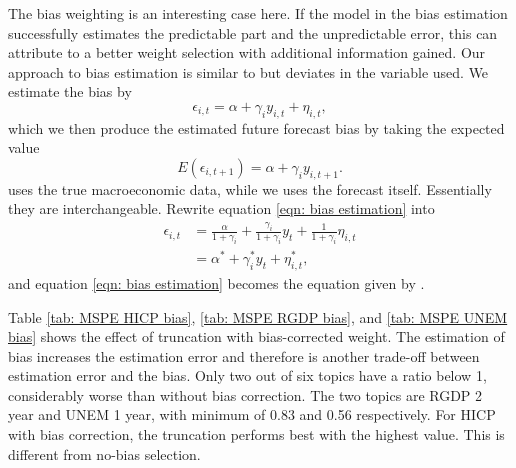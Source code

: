 \documentclass[11pt]{article}
\begin{document}
The bias weighting is an interesting case here. If the model in the bias
estimation successfully estimates the predictable part and the
unpredictable error, this can attribute to a better weight selection
with additional information gained. Our approach to bias estimation is similar to \cite{Gibbs2017} but deviates in the variable used. We estimate the bias by
\begin{equation}
\label{eqn: bias estimation}
\epsilon_{i,t} = \alpha + \gamma_i y_{i,t} + \eta_{i,t},
\end{equation}
which we then produce the estimated future forecast bias by taking the expected value
\begin{equation}
E(\epsilon_{i,t+1}) = \alpha + \gamma_i y_{i,t+1}.
\end{equation}
\citeauthor{Gibbs2017} uses the true macroeconomic data, while we uses the forecast itself. Essentially they are interchangeable. Rewrite equation \ref{eqn: bias estimation} into
\begin{equation}
\begin{aligned}
\epsilon_{i,t} &= \frac{\alpha}{1+\gamma_i}+\frac{\gamma_i}{1+\gamma_i}y_t + \frac{1}{1+\gamma_i}\eta_{i,t}\\
&= \alpha^* + \gamma_i^* y_t + \eta_{i,t}^*,
\end{aligned} 
\end{equation}
and equation \ref{eqn: bias estimation} becomes the equation given by \citeauthor{Gibbs2017}.

Table \ref{tab: MSPE HICP bias}, \ref{tab: MSPE RGDP bias}, and \ref{tab: MSPE UNEM bias} shows the effect of truncation with bias-corrected weight. The estimation of bias increases the estimation error and therefore is another trade-off between estimation error and the bias. Only two out of six topics have a ratio below 1, considerably worse than without bias correction. The two topics are RGDP 2 year and UNEM 1 year, with minimum of 0.83 and 0.56 respectively. For HICP with bias correction, the truncation performs best with the highest value. This is different from no-bias selection.
\end{document}
